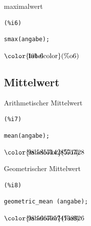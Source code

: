\documentclass[12pt]{article}
\begin{document}
maximalwert

\noindent
\begin{minipage}[t]{8ex}{\color{red}\bf
\begin{verbatim}
(%i6) 
\end{verbatim}}
\end{minipage}
\begin{minipage}[t]{\textwidth}{\color{blue}
\begin{verbatim}
smax(angabe);
\end{verbatim}}
\end{minipage}
\begin{math}\displaystyle
\parbox{8ex}{\color{labelcolor}(\%o6) }
101.6
\end{math}


\subsection{Mittelwert}


Arithmetischer Mittelwert

\noindent
\begin{minipage}[t]{8ex}{\color{red}\bf
\begin{verbatim}
(%i7) 
\end{verbatim}}
\end{minipage}
\begin{minipage}[t]{\textwidth}{\color{blue}
\begin{verbatim}
mean(angabe);
\end{verbatim}}
\end{minipage}
\begin{math}\displaystyle
\parbox{8ex}{\color{labelcolor}(\%o7) }
98.58571428571428
\end{math}

Geometrischer Mittelwert

\noindent
\begin{minipage}[t]{8ex}{\color{red}\bf
\begin{verbatim}
(%i8) 
\end{verbatim}}
\end{minipage}
\begin{minipage}[t]{\textwidth}{\color{blue}
\begin{verbatim}
geometric_mean (angabe);
\end{verbatim}}
\end{minipage}
\begin{math}\displaystyle
\parbox{8ex}{\color{labelcolor}(\%o8) }
98.56670574148326
\end{math}
\end{document}
